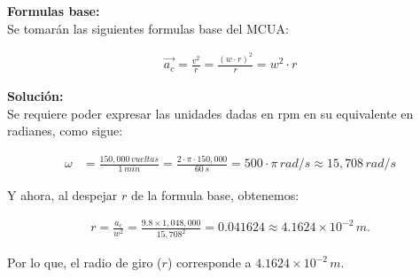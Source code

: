 \documentclass[11pt,letterpaper]{article}
\begin{document}
\textbf{Formulas base:}\\

Se tomarán las siguientes formulas base del MCUA:

\begin{align}
\boxed{ \vec{a_{c}} = \frac{v^2}{r} = \frac{(w \cdot r)^2}{r} = w^2 \cdot r}
\end{align}

\textbf{Solución:}\\

Se requiere poder expresar las unidades dadas en rpm en su equivalente en radianes, como sigue:

\begin{align}
\omega &= \frac{150,000\,vueltas}{1\,min} = \frac{2 \cdot \pi \cdot 150,000}{60\,s} = 500 \cdot \pi\,rad/s \approx 15,708\,rad/s
\end{align}

Y ahora, al despejar $r$ de la formula base, obtenemos:

\begin{align}
r = \frac{a_{c}}{w^2} = \frac{9.8 \times 1,048,000}{15,708^2} = 0.041624 \approx 4.1624 \times 10^{-2}\,m.
\end{align}

Por lo que, el radio de giro ($r$) corresponde a $4.1624 \times 10^{-2}\,m.$

\end{document}
